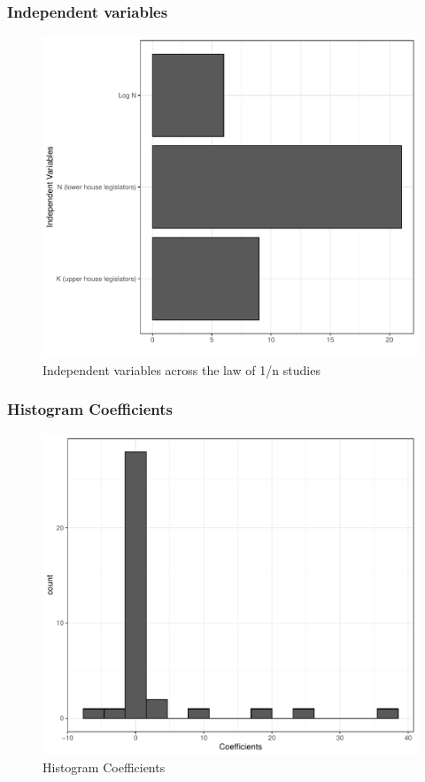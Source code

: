 \documentclass[
]{article}
\begin{document}
\newpage

\hypertarget{independent-variables}{%
\subsubsection{Independent variables}\label{independent-variables}}

\begin{figure}
\centering
\includegraphics{appendixV5_files/figure-latex/unnamed-chunk-5-1.pdf}
\caption{Independent variables across the law of 1/n studies}
\end{figure}

\newpage

\hypertarget{histogram-coefficients}{%
\subsubsection{Histogram Coefficients}\label{histogram-coefficients}}

\begin{figure}
\centering
\includegraphics{appendixV5_files/figure-latex/unnamed-chunk-6-1.pdf}
\caption{Histogram Coefficients}
\end{figure}
\end{document}
